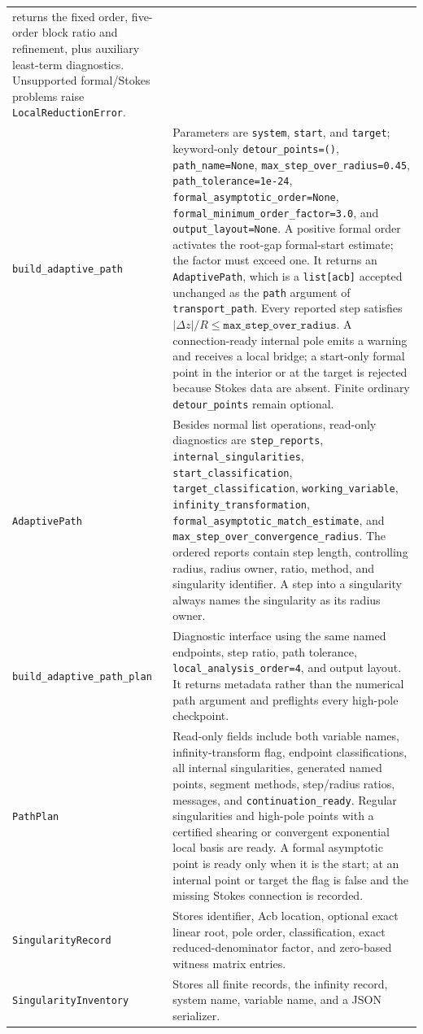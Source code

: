 \documentclass[11pt]{article}
\begin{document}
\begin{longtable}{L{0.36\textwidth}L{0.58\textwidth}}
returns the fixed order, five-order block ratio and refinement, plus auxiliary least-term diagnostics.  Unsupported formal/Stokes problems raise
\texttt{LocalReductionError}. \\
\texttt{build\_adaptive\_path} & Parameters are \texttt{system}, \texttt{start}, and
\texttt{target}; keyword-only \texttt{detour\_points=()}, \texttt{path\_name=None},
\texttt{max\_step\_over\_radius=0.45}, \texttt{path\_tolerance=1e-24},
\texttt{formal\_asymptotic\_order=None},
\texttt{formal\_minimum\_order\_factor=3.0}, and \texttt{output\_layout=None}.  A positive
formal order activates the root-gap formal-start estimate; the factor must exceed one.  It returns an \texttt{AdaptivePath}, which is a
\texttt{list[acb]} accepted unchanged as the \texttt{path} argument of
\texttt{transport\_path}.  Every reported step satisfies
$|\Delta z|/R\leq\texttt{max\_step\_over\_radius}$.  A connection-ready internal pole emits
a warning and receives a local bridge; a start-only formal point in the interior or at the
target is rejected because Stokes data are absent.  Finite ordinary
\texttt{detour\_points} remain optional. \\
\texttt{AdaptivePath} & Besides normal list operations, read-only diagnostics are
\texttt{step\_reports}, \texttt{internal\_singularities},
\texttt{start\_classification}, \texttt{target\_classification}, \texttt{working\_variable},
\texttt{infinity\_transformation}, \texttt{formal\_asymptotic\_match\_estimate}, and
\texttt{max\_step\_over\_convergence\_radius}.  The ordered reports contain step length,
controlling radius, radius owner, ratio, method, and singularity identifier.  A step into a
singularity always names the singularity as its radius owner. \\
\texttt{build\_adaptive\_path\_plan} & Diagnostic interface using the same named endpoints,
step ratio, path tolerance, \texttt{local\_analysis\_order=4}, and output layout.  It returns
metadata rather than the numerical path argument and preflights every high-pole checkpoint. \\
\texttt{PathPlan} & Read-only fields include both variable names, infinity-transform flag,
endpoint classifications, all internal singularities, generated named points, segment
methods, step/radius ratios, messages, and \texttt{continuation\_ready}.  Regular singularities
and high-pole points with a certified shearing or convergent exponential local basis are
ready.  A formal asymptotic point is ready only when it is the start; at an internal point or
target the flag is false and the missing Stokes connection is recorded. \\
\texttt{SingularityRecord} & Stores identifier, Acb location, optional exact linear root,
pole order, classification, exact reduced-denominator factor, and zero-based witness matrix
entries. \\
\texttt{SingularityInventory} & Stores all finite records, the infinity record, system name,
variable name, and a JSON serializer. \\
\bottomrule
\end{longtable}
\normalsize
\end{document}
